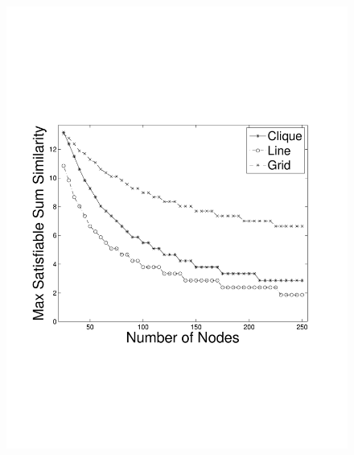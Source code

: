 \begin{figure}
{	\includegraphics[scale=0.23, clip=true, trim=14mm 65mm 20mm 65mm]{figures/use_cases_examples/sum_sim_vs_num_nodes_50_T_12_IS_2_W.pdf}
        \label{fig:use_case_sum_sim_vs_num_nodes}
        }
  \subfigure[Max Network Size vs. SS (T = 10)]{
}
\end{figure}
